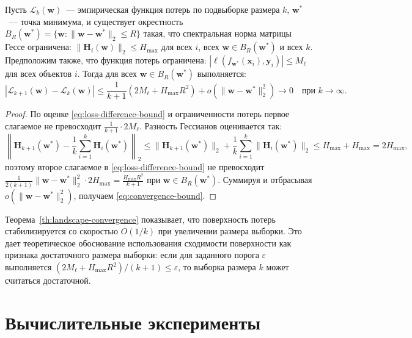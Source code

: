 \begin{theorem}\label{th:landscape-convergence}
Пусть $\mathcal{L}_k(\mathbf{w})$~--- эмпирическая функция потерь по подвыборке размера $k$, $\mathbf{w}^*$~--- точка минимума, и существует окрестность $B_R(\mathbf{w}^*) = \{\mathbf{w} : \|\mathbf{w} - \mathbf{w}^*\|_2 \leqslant R\}$ такая, что спектральная норма матрицы Гессе ограничена: $\|\mathbf{H}_i(\mathbf{w})\|_2 \leqslant H_{\max}$ для всех $i$, всех $\mathbf{w} \in B_R(\mathbf{w}^*)$ и всех $k$. Предположим также, что функция потерь ограничена: $|\ell(f_{\mathbf{w}^*}(\mathbf{x}_i), \mathbf{y}_i)| \leqslant M_{\ell}$ для всех объектов $i$. Тогда для всех $\mathbf{w} \in B_R(\mathbf{w}^*)$ выполняется:
\begin{equation}
\label{eq:convergence-bound}
|\mathcal{L}_{k+1}(\mathbf{w}) - \mathcal{L}_k(\mathbf{w})| \leqslant \frac{1}{k+1}\left(2M_{\ell} + H_{\max} R^2\right) + o(\|\mathbf{w}-\mathbf{w}^*\|_2^2) \to 0 \quad \text{при } k \to \infty.
\end{equation}
\end{theorem}

\begin{proof}
По оценке \eqref{eq:loss-difference-bound} и ограниченности потерь первое слагаемое не превосходит $\frac{1}{k+1}\cdot 2M_{\ell}$. Разность Гессианов оценивается так:
\[
\left\|\mathbf{H}_{k+1}(\mathbf{w}^*) - \frac{1}{k}\sum_{i=1}^k \mathbf{H}_i(\mathbf{w}^*)\right\|_2 \leqslant \|\mathbf{H}_{k+1}(\mathbf{w}^*)\|_2 + \frac{1}{k}\sum_{i=1}^k \|\mathbf{H}_i(\mathbf{w}^*)\|_2 \leqslant H_{\max} + H_{\max} = 2H_{\max},
\]
поэтому второе слагаемое в \eqref{eq:loss-difference-bound} не превосходит $\frac{1}{2(k+1)}\|\mathbf{w}-\mathbf{w}^*\|_2^2 \cdot 2H_{\max} = \frac{H_{\max} R^2}{k+1}$ при $\mathbf{w} \in B_R(\mathbf{w}^*)$. Суммируя и отбрасывая $o(\|\mathbf{w}-\mathbf{w}^*\|_2^2)$, получаем \eqref{eq:convergence-bound}.
\end{proof}

Теорема~\ref{th:landscape-convergence} показывает, что поверхность потерь стабилизируется со скоростью $O(1/k)$ при увеличении размера выборки. Это дает теоретическое обоснование использования сходимости поверхности как признака достаточного размера выборки: если для заданного порога $\varepsilon$ выполняется $(2M_{\ell} + H_{\max} R^2)/(k+1) \leqslant \varepsilon$, то выборка размера $k$ может считаться достаточной.

\section{Вычислительные эксперименты}

